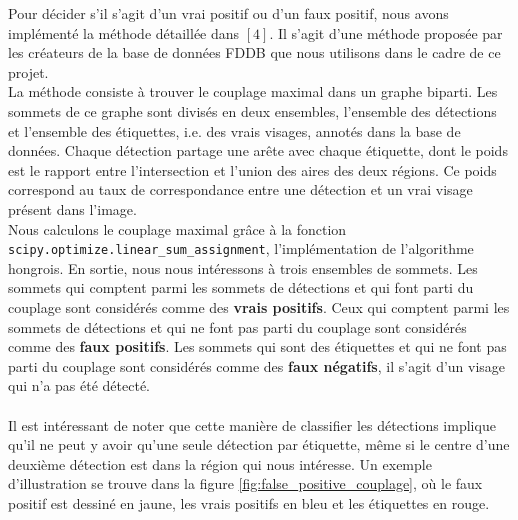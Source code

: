 \documentclass[a4paper,11pt]{article}
\begin{document}
        Pour décider s'il s'agit d'un vrai positif ou d'un faux positif, nous avons implémenté la méthode détaillée dans $[4]$.
        Il s'agit d'une méthode proposée par les créateurs de la base de données FDDB que nous utilisons dans le cadre de ce projet.
        \\
        La méthode consiste à trouver le couplage maximal dans un graphe biparti.
        Les sommets de ce graphe sont divisés en deux ensembles, l'ensemble des détections et l'ensemble des étiquettes, i.e. des vrais visages, annotés dans la base de données.
        Chaque détection partage une arête avec chaque étiquette, dont le poids est le rapport entre l'intersection et l'union des aires des deux régions.
        Ce poids correspond au taux de correspondance entre une détection et un vrai visage présent dans l'image.
        \\
        Nous calculons le couplage maximal grâce à la fonction \verb!scipy.optimize.linear_sum_assignment!, l'implémentation de l'algorithme hongrois.
        En sortie, nous nous intéressons à trois ensembles de sommets. 
        Les sommets qui comptent parmi les sommets de détections et qui font parti du couplage sont considérés comme des {\bf vrais positifs}.
        Ceux qui comptent parmi les sommets de détections et qui ne font pas parti du couplage sont considérés comme des {\bf faux positifs}.
        Les sommets qui sont des étiquettes et qui ne font pas parti du couplage sont considérés comme des {\bf faux négatifs}, il s'agit d'un visage qui n'a pas été détecté.
        \\
        \\
        Il est intéressant de noter que cette manière de classifier les détections implique qu'il ne peut y avoir qu'une seule détection par étiquette, même si le centre d'une deuxième détection est dans la région qui nous intéresse.
        Un exemple d'illustration se trouve dans la figure \ref{fig:false_positive_couplage}, où le faux positif est dessiné en jaune, les vrais positifs en bleu et les étiquettes en rouge.
\end{document}
